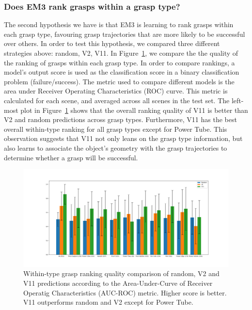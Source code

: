 
\subsubsection{Does EM3 rank grasps within a grasp type?}
\noindent

The second hypothesis we have is that EM3 is learning to rank grasps within each grasp type, favouring grasp trajectories that are more likely to be successful over others. In order to test this hypothesis, we compared three different strategies above: random, V2, V11. In Figure~\ref{fig:post5}, we compare the the quality of the ranking of grasps within each grasp type. In order to compare rankings, a model's output score is used as the classification score in a binary classification problem (failure/success). The metric used to compare different models is the area under Receiver Operating Characteristics (ROC) curve. This metric is calculated for each scene, and averaged across all scenes in the test set. The left-most plot in Figure~\ref{fig:post5} shows that the overall ranking quality of V11 is better than V2 and random predictions across grasp types. Furthermore, V11 has the best overall within-type ranking for all grasp types except for Power Tube. This observation suggests that V11 not only leans on the grasp type information, but also learns to associate the object's geometry with the grasp trajectories to determine whether a grasp will be successful.

\begin{figure}
\centering
\includegraphics[width=0.999\columnwidth]{images/post-analysis/Ranking_quality_mean_AUC.png}
\caption{Within-type grasp ranking quality comparison of random, V2 and V11 predictions according to the Area-Under-Curve of Receiver Operatig Characteristics (AUC-ROC) metric. Higher score is better. V11 outperforms random and V2 except for Power Tube.}
\label{fig:post5}
\end{figure}

